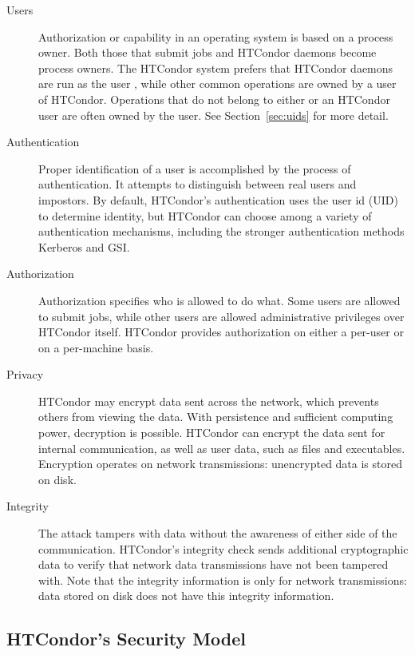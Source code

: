 \begin{description}

\item[Users] Authorization or capability in an operating system is
based on a process owner.
Both those that submit jobs and HTCondor daemons
become process owners.
The HTCondor system prefers that HTCondor daemons are run as the user
, while other common operations are owned by a
user of HTCondor.
Operations that do not belong to either  or an HTCondor user
are often owned by the  user.
See Section~\ref{sec:uids} for more detail.

\item[Authentication] 
Proper identification of a user is accomplished by the
process of authentication.
It attempts to distinguish between real users and impostors.
By default, HTCondor's authentication uses the user id (UID)
to determine identity,
but HTCondor can choose among a variety of authentication mechanisms,
including the stronger  authentication methods Kerberos and GSI.

\item[Authorization] Authorization specifies who is allowed
to do what.
Some users are allowed to submit jobs,
while other users are allowed administrative privileges over HTCondor itself.
HTCondor provides authorization on either a per-user or on
a per-machine basis.

\item[Privacy] HTCondor may encrypt data sent across the network, which
prevents others from viewing the data.
With persistence and sufficient computing power,
decryption is possible. 
HTCondor can encrypt the data sent for internal communication, 
as well as user data, such as files and executables.
Encryption operates on network
transmissions: unencrypted data is stored on disk.

\item[Integrity] 
The   attack tampers with data
without the awareness of either side of the communication.
HTCondor's integrity check sends additional cryptographic data
to verify that network data transmissions have not been
tampered with.
Note that the integrity information is only for network
transmissions: data stored on disk does not have this integrity
information. 

\end{description}


\subsection{\label{sec:Config-Security}HTCondor's Security Model}

